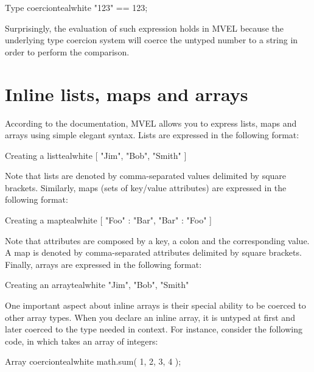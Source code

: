 \begin{codebox}{Type coercion}{teal}{\icnote}{white}
"123" == 123;
\end{codebox}

Surprisingly, the evaluation of such expression holds  in MVEL because the underlying type coercion system will coerce the untyped number  to a string  in order to perform the comparison.

\section{Inline lists, maps and arrays}
\label{sec:mvelinlinelistsmapsandarrays}

According to the documentation, MVEL allows you to express lists, maps and arrays using simple elegant syntax. Lists are expressed in the following format:

\begin{codebox}{Creating a list}{teal}{\icnote}{white}
[ "Jim", "Bob", "Smith" ]
\end{codebox}

Note that lists are denoted by comma-separated values delimited by square brackets. Similarly, maps (sets of key/value attributes) are expressed in the following format: 

\begin{codebox}{Creating a map}{teal}{\icnote}{white}
[ "Foo" : "Bar", "Bar" : "Foo" ]
\end{codebox}

Note that attributes are composed by a key, a colon and the corresponding value. A map is denoted by comma-separated attributes delimited  by square brackets. Finally, arrays are expressed in the following format:

\begin{codebox}{Creating an array}{teal}{\icnote}{white}
{ "Jim", "Bob", "Smith" }
\end{codebox}

One important aspect about inline arrays is their special ability to be coerced to other array types. When you declare an inline array, it is untyped at first and later coerced to the type needed in context. For instance, consider the following code, in which  takes an array of integers:

\begin{codebox}{Array coercion}{teal}{\icnote}{white}
math.sum({ 1, 2, 3, 4 });
\end{codebox}

